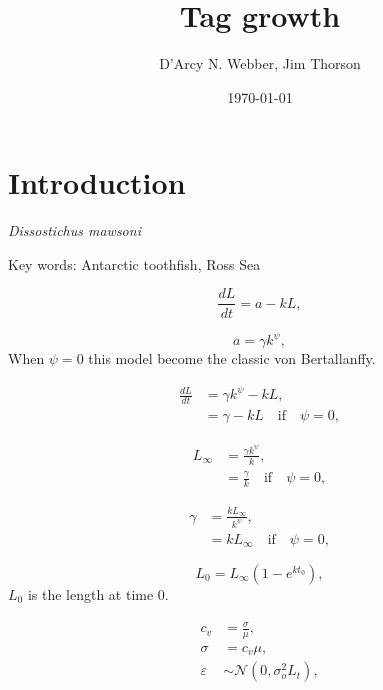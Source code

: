 \documentclass[11pt, a4paper]{article}
\title{Tag growth}
\author{D'Arcy N. Webber, Jim Thorson}
\date{\today}
\begin{document}
\maketitle

\section{Introduction}
\textit{Dissostichus mawsoni}

Key words: Antarctic toothfish, Ross Sea


\begin{equation}
  \frac{dL}{dt} = a - k L,
\end{equation}

\begin{equation}
  a = \gamma k^\psi,
\end{equation}
When $\psi = 0$ this model become the classic von Bertallanffy.

\begin{align}
  \frac{dL}{dt} &= \gamma k^\psi - k L,\\
  &= \gamma - k L \quad \text{if} \quad \psi = 0,
\end{align}

\begin{align}
  L_\infty &= \frac{\gamma k^\psi}{k},\\
  &= \frac{\gamma}{k} \quad \text{if} \quad \psi = 0, 
\end{align}

\begin{align}
  \gamma &= \frac{k L_\infty}{k^\psi},\\
  &= k L_\infty \quad \text{if} \quad \psi = 0, 
\end{align}


\begin{equation}
  L_0 = L_\infty \left( 1 - e^{k t_0} \right),
\end{equation}
$L_0$ is the length at time 0.

\begin{align}
  c_v &= \frac{\sigma}{\mu},\\
  \sigma &= c_v \mu,\\
  \varepsilon &\sim \mathcal{N} \left( 0, \sigma^2_o L_t \right),
\end{align}
\end{document}
